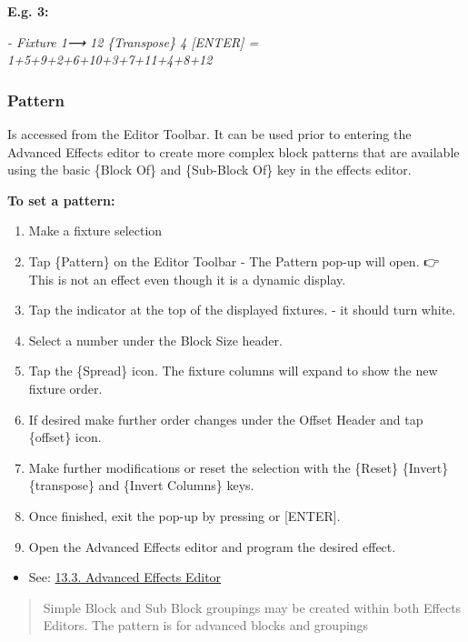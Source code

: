 \documentclass[
]{article}
\providecommand{\tightlist}{%
  \setlength{\itemsep}{0pt}\setlength{\parskip}{0pt}}
\begin{document}
\textbf{E.g. 3:}

\emph{- Fixture 1⟶ 12 \{Transpose\} 4 {[}ENTER{]} = 1+5+9+2+6+10+3+7+11+4+8+12}

\hypertarget{pattern}{%
\subsubsection{Pattern}\label{pattern}}

Is accessed from the Editor Toolbar. It can be used prior to entering the Advanced Effects editor to create more complex block patterns that are available using the basic \{Block Of\} and \{Sub-Block Of\} key in the effects editor.

\textbf{To set a pattern:}

\begin{enumerate}
\def\labelenumi{\arabic{enumi}.}
\item
  Make a fixture selection
\item
  Tap \{Pattern\} on the Editor Toolbar - The Pattern pop-up will open. 👉 {This is not an effect even though it is a dynamic display.}
\item
  Tap the indicator at the top of the displayed fixtures. - it should turn white.
\item
  Select a number under the Block Size header.
\item
  Tap the \{Spread\} icon. The fixture columns will expand to show the new fixture order.
\item
  If desired make further order changes under the Offset Header and tap \{offset\} icon.
\item
  Make further modifications or reset the selection with the \{Reset\} \{Invert\} \{transpose\} and \{Invert Columns\} keys.
\item
  Once finished, exit the pop-up by pressing \href{image.png}{} or {[}ENTER{]}.
\item
  Open the Advanced Effects editor and program the desired effect.
\end{enumerate}

\begin{itemize}
\tightlist
\item
  See: \href{https://vibemanual.compulite.com/effects-1.html\#advanced-effects-editor}{13.3. Advanced Effects Editor}
\end{itemize}

\begin{quote}
Simple Block and Sub Block groupings may be created within both Effects Editors. The pattern is for advanced blocks and groupings
\end{quote}
\end{document}
